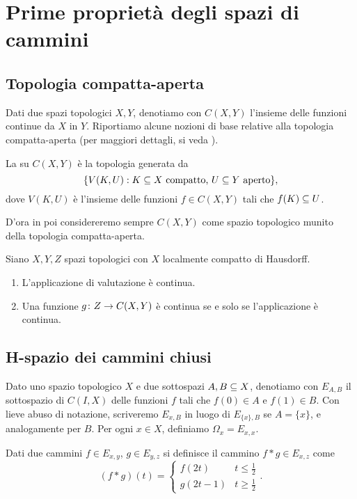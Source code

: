 \section{Prime proprietà degli spazi di cammini}
\subsection{Topologia compatta-aperta}
Dati due spazi topologici \(X,Y\), denotiamo con \(C(X,Y)\) l'insieme delle funzioni continue da \(X\) in \(Y\). Riportiamo alcune nozioni di base relative alla topologia compatta-aperta (per maggiori dettagli, si veda ).
\begin{definition}
La  su \(C(X,Y)\) è la topologia generata da 
\[
\{V(K,U):\text{\(K\subseteq X\) compatto, \(U\subseteq Y\) aperto}\},
\]
dove \(V(K,U)\) è l'insieme delle funzioni \(f\in C(X,Y)\) tali che \(f(K)\subseteq U\).
\end{definition}
D'ora in poi considereremo sempre \(C(X,Y)\) come spazio topologico munito della topologia compatta-aperta.
\begin{proposition}
Siano \(X,Y,Z\) spazi topologici con \(X\) localmente compatto di Hausdorff.
\begin{enumerate}
\item L'applicazione di valutazione
è continua.
\item Una funzione \(\map{g}{Z}{C(X,Y)}\) è continua se e solo se l'applicazione
è continua.
\end{enumerate}
\end{proposition}

\subsection{H-spazio dei cammini chiusi}

Dato uno spazio topologico \(X\) e due sottospazi \(A,B\subseteq X\), denotiamo con \(E_{A,B}\) il sottospazio di \(C(I,X)\) delle funzioni \(f\) tali che \(f(0)\in A\) e \(f(1)\in B\). Con lieve abuso di notazione, scriveremo \(E_{x,B}\) in luogo di \(E_{\{x\},B}\) se \(A=\{x\}\), e analogamente per \(B\). Per ogni \(x\in X\), definiamo \(\Omega_x=E_{x,x}\).

Dati due cammini \(f\in E_{x,y}\), \(g\in E_{y,z}\) si definisce il cammino \(f\ast g\in E_{x,z}\) come
\[
(f\ast g)(t)=
\begin{cases}
f(2t)&t\le\frac{1}{2}\\
g(2t-1)&t\ge\frac{1}{2}
\end{cases}.
\]

